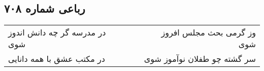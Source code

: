 \begin{center}
\section*{رباعی شماره ۷۰۸}
\label{sec:sh708}
\begin{longtable}{l p{0.5cm} r}
در مدرسه گر چه دانش اندوز شوی
&&
وز گرمی بحث مجلس افروز شوی
\\
در مکتب عشق با همه دانایی
&&
سر گشته چو طفلان نوآموز شوی
\\
\end{longtable}
\end{center}
